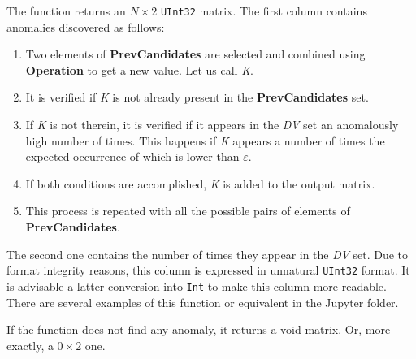 \begin{itemize}
\begin{itemize}
 		\end{itemize}
 		
 		The function returns an \(N\times 2\) \texttt{UInt32} matrix. The first column contains anomalies discovered as follows:
 		
 			 \begin{enumerate}
 			 	 \item Two elements of \textbf{PrevCandidates} are selected and combined using \textbf{Operation} to get a new value. Let us call \textit{K}.
 			 	 \item It is verified if \textit{K} is not already present in the \textbf{PrevCandidates} set.
 			 	 \item If \textit{K} is not therein, it is verified if it appears in the \textit{DV} set an anomalously high number of times. This happens if \textit{K} appears a number of times the expected occurrence of which is lower than \textbf{\(\varepsilon\)}.
 			 	 \item If both conditions are accomplished, \textit{K} is added to the output matrix.
 			 	 \item This process is repeated with all the possible pairs of elements of \textbf{PrevCandidates}.
 			 \end{enumerate}
 		 
 		The second one contains the number of times they appear in the \textit{DV} set. Due to format integrity reasons, this column is expressed in unnatural \texttt{UInt32} format. It is advisable a latter conversion into \texttt{Int} to make this column more readable. There are several examples of this function or equivalent in the Jupyter folder.
 		
 		If the function does not find any anomaly, it returns a void matrix.  Or, more exactly, a \(0\times 2\) one.
 		
 \end{itemize}
